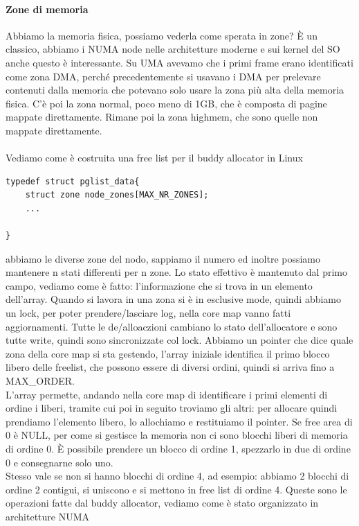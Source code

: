 \documentclass[12pt, oneside]{extbook}
\begin{document}
\paragraph{Zone di memoria} Abbiamo la memoria fisica, possiamo vederla come sperata in zone? È un classico, abbiamo i NUMA node nelle architetture moderne e sui kernel del SO anche questo è interessante. Su UMA avevamo che i primi frame erano identificati come zona DMA, perché precedentemente si usavano i DMA per prelevare contenuti dalla memoria che potevano solo usare la zona più alta della memoria fisica. C'è poi la zona normal, poco meno di 1GB, che è composta di pagine mappate direttamente. Rimane poi la zona highmem, che sono quelle non mappate direttamente.\\\\ Vediamo come è costruita una free list per il buddy allocator in Linux
\begin{lstlisting}
typedef struct pglist_data{
	struct zone node_zones[MAX_NR_ZONES];
	...
	
}
\end{lstlisting}
abbiamo le diverse zone del nodo, sappiamo il numero ed inoltre possiamo mantenere n stati differenti per n zone. Lo stato effettivo è mantenuto dal primo campo, vediamo come è fatto:
l'informazione che si trova in un elemento dell'array. Quando si lavora in una zona si è in esclusive mode, quindi abbiamo un lock, per poter prendere/lasciare log, nella core map vanno fatti aggiornamenti. Tutte le de/alloaczioni cambiano lo stato dell'allocatore e sono tutte write, quindi sono sincronizzate col lock. Abbiamo un pointer che dice quale zona della core map si sta gestendo, l'array iniziale identifica il primo blocco libero delle freelist, che possono essere di diversi ordini, quindi si arriva fino a MAX\_ORDER.\\ L'array permette, andando nella core map di identificare i primi elementi di ordine i liberi, tramite cui poi in seguito troviamo gli altri: per allocare quindi prendiamo l'elemento libero, lo allochiamo e restituiamo il pointer. Se free area di 0 è NULL, per come si gestisce la memoria non ci sono blocchi liberi di memoria di ordine 0. È possibile prendere un blocco di ordine 1, spezzarlo in due di ordine 0 e consegnarne solo uno.\\ Stesso vale se non si hanno blocchi di ordine 4, ad esempio: abbiamo 2 blocchi di ordine 2 contigui, si uniscono e si mettono in free list di ordine 4. Queste sono le operazioni fatte dal buddy allocator, vediamo come è stato organizzato in architetture NUMA
\end{document}
